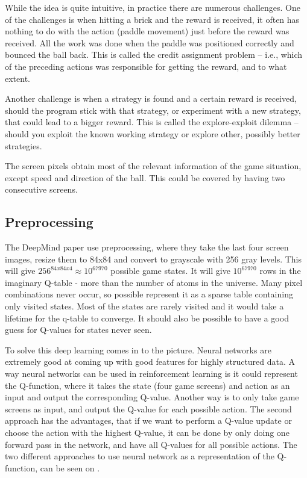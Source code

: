 While the idea is quite intuitive, in practice there are numerous challenges. One of the challenges is when hitting a brick and the reward is received, it often has nothing to do with the action (paddle movement) just before the reward was received. All the work was done when the paddle was positioned correctly and bounced the ball back. This is called the credit assignment problem – i.e., which of the preceding actions was responsible for getting the reward, and to what extent. 

Another challenge is when a strategy is found and a certain reward is received, should the program stick with that strategy, or experiment with a new strategy, that could lead to a bigger reward. This is called the explore-exploit dilemma – should you exploit the known working strategy or explore other, possibly better strategies.  

The screen pixels obtain most of the relevant information of the game situation, except speed and direction of the ball. This could be covered by having two consecutive screens. 

\subsection{Preprocessing}
The DeepMind paper use preprocessing, where they take the last four screen images, resize them to 84x84 and convert to grayscale with 256 gray levels. This will give $256^{84x84x4} \approx 10^{67970}$ possible game states. It will give $10^{67970}$ rows in the imaginary Q-table - more than the number of atoms in the universe. Many pixel combinations never occur, so possible represent it as a sparse table containing only visited states. Most of the states are rarely visited and it would take a lifetime for the q-table to converge. It should also be possible to have a good guess for Q-values for states never seen.  

To solve this deep learning comes in to the picture. Neural networks are extremely good at coming up with good features for highly structured data. A way neural networks can be used in reinforcement learning is it could represent the Q-function, where it takes the state (four game screens) and action as an input and output the corresponding Q-value. Another way is to only take game screens as input, and output the Q-value for each possible action. The second approach has the advantages, that if we want to perform a Q-value update or choose the action with the highest Q-value, it can be done by only doing one forward pass in the network, and have all Q-values for all possible actions. The two different approaches to use neural network as a representation of the Q-function, can be seen on .               


